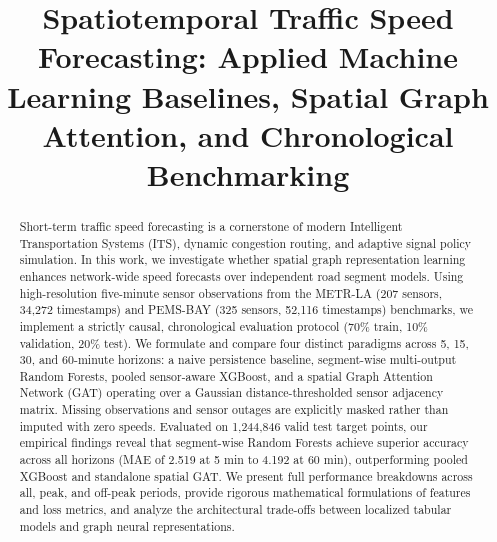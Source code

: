 \documentclass[conference]{IEEEtran}
\begin{document}
\title{Spatiotemporal Traffic Speed Forecasting: Applied Machine Learning Baselines, Spatial Graph Attention, and Chronological Benchmarking}

\author{
}

\maketitle

\begin{abstract}
Short-term traffic speed forecasting is a cornerstone of modern Intelligent Transportation Systems (ITS), dynamic congestion routing, and adaptive signal policy simulation. In this work, we investigate whether spatial graph representation learning enhances network-wide speed forecasts over independent road segment models. Using high-resolution five-minute sensor observations from the METR-LA (207 sensors, 34,272 timestamps) and PEMS-BAY (325 sensors, 52,116 timestamps) benchmarks, we implement a strictly causal, chronological evaluation protocol (70\% train, 10\% validation, 20\% test). We formulate and compare four distinct paradigms across 5, 15, 30, and 60-minute horizons: a naive persistence baseline, segment-wise multi-output Random Forests, pooled sensor-aware XGBoost, and a spatial Graph Attention Network (GAT) operating over a Gaussian distance-thresholded sensor adjacency matrix. Missing observations and sensor outages are explicitly masked rather than imputed with zero speeds. Evaluated on 1,244,846 valid test target points, our empirical findings reveal that segment-wise Random Forests achieve superior accuracy across all horizons (MAE of 2.519 at 5 min to 4.192 at 60 min), outperforming pooled XGBoost and standalone spatial GAT. We present full performance breakdowns across all, peak, and off-peak periods, provide rigorous mathematical formulations of features and loss metrics, and analyze the architectural trade-offs between localized tabular models and graph neural representations.
\end{abstract}
\end{document}
